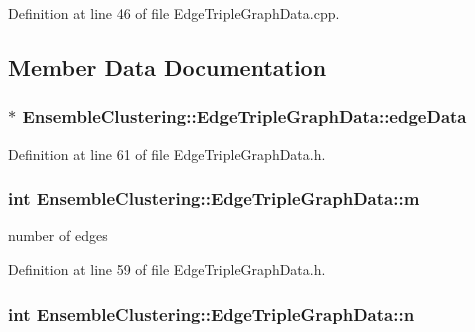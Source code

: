 Definition at line 46 of file Edge\-Triple\-Graph\-Data.\-cpp.



\subsection{Member Data Documentation}
\hypertarget{class_ensemble_clustering_1_1_edge_triple_graph_data_acb27bbd92c258f29537e2d9a94e973ea}{
\subsubsection[{edge\-Data}]{$\ast$ Ensemble\-Clustering\-::\-Edge\-Triple\-Graph\-Data\-::edge\-Data}}\label{class_ensemble_clustering_1_1_edge_triple_graph_data_acb27bbd92c258f29537e2d9a94e973ea}


Definition at line 61 of file Edge\-Triple\-Graph\-Data.\-h.

\hypertarget{class_ensemble_clustering_1_1_edge_triple_graph_data_a5ee6e7a60111a4120f880db9ae16d0cb}{
\subsubsection[{m}]{\setlength{\rightskip}{0pt plus 5cm}int Ensemble\-Clustering\-::\-Edge\-Triple\-Graph\-Data\-::m}}\label{class_ensemble_clustering_1_1_edge_triple_graph_data_a5ee6e7a60111a4120f880db9ae16d0cb}


number of edges 



Definition at line 59 of file Edge\-Triple\-Graph\-Data.\-h.

\hypertarget{class_ensemble_clustering_1_1_edge_triple_graph_data_a907cee0110aa331fa3c3ddd99b8deaf7}{
\subsubsection[{n}]{\setlength{\rightskip}{0pt plus 5cm}int Ensemble\-Clustering\-::\-Edge\-Triple\-Graph\-Data\-::n}}\label{class_ensemble_clustering_1_1_edge_triple_graph_data_a907cee0110aa331fa3c3ddd99b8deaf7}



